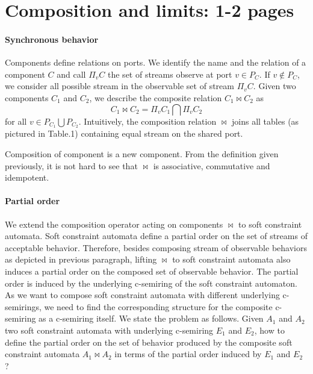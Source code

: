 \section{Composition and limits: 1-2 pages}
\paragraph{Synchronous behavior} Components define relations on ports. We identify the name and the relation of a component $C$ and call $\Pi_v C$ the set of streams observe at port $v \in P_{C}$. If $v\notin P_{C}$, we consider all possible stream in the observable set of stream $\Pi_v C$. Given two components $C_1$ and $C_2$, we describe the composite relation $C_1 \bowtie C_2$ as $$C_1 \bowtie C_2 = \Pi_v C_1 \bigcap \Pi_v C_2$$
for all $v \in P_{C_1} \bigcup P_{C_2}$. Intuitively, the composition relation $\bowtie$ joins all tables (as pictured in Table.1) containing equal stream on the shared port.

Composition of component is a new component. From the definition given previously, it is not hard to see that $\bowtie$ is associative, commutative and idempotent.


\paragraph{Partial order} We extend the composition operator acting on components $\bowtie$ to soft constraint automata. Soft constraint automata define a partial order on the set of streams of acceptable behavior. Therefore, besides composing stream of observable behaviors as depicted in previous paragraph, lifting $\bowtie$ to soft constraint automata also induces a partial order on the composed set of observable behavior.
The partial order is induced by the underlying c-semiring of the soft constraint automaton. As we want to compose soft constraint automata with different underlying c-semirings, we need to find the corresponding structure for the composite c-semiring as a c-semiring itself. We state the problem as follows. Given $A_1$ and $A_2$ two soft constraint automata with underlying c-semiring $E_1$ and $E_2$, how to define the partial order on the set of behavior produced by the composite soft constraint automata $A_1 \bowtie A_2$ in terms of the partial order induced by $E_1$ and $E_2$ ?
